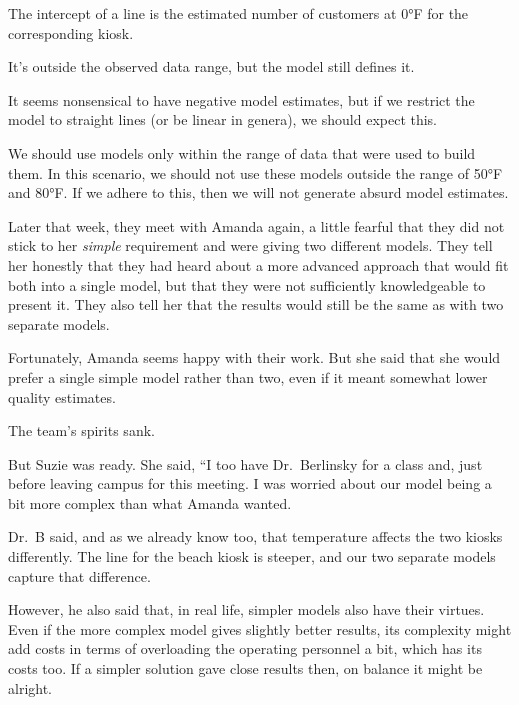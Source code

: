 \documentclass[
  12pt,
  letterpaper,
  DIV=11,
  numbers=noendperiod]{scrreprt}
\begin{document}
\begin{tcolorbox}[enhanced jigsaw, colback=white, leftrule=.75mm, toprule=.15mm, bottomtitle=1mm, breakable, coltitle=black, toptitle=1mm, title=\textcolor{quarto-callout-important-color}{\faExclamation}\hspace{0.5em}{Important}, opacitybacktitle=0.6, colbacktitle=quarto-callout-important-color!10!white, arc=.35mm, left=2mm, colframe=quarto-callout-important-color-frame, titlerule=0mm, rightrule=.15mm, bottomrule=.15mm, opacityback=0]

The intercept of a line is the estimated number of customers at 0°F for
the corresponding kiosk.

It's outside the observed data range, but the model still defines it.

It seems nonsensical to have negative model estimates, but if we
restrict the model to straight lines (or be linear in genera), we should
expect this.

We should use models only within the range of data that were used to
build them. In this scenario, we should not use these models outside the
range of 50°F and 80°F. If we adhere to this, then we will not generate
absurd model estimates.

\end{tcolorbox}

Later that week, they meet with Amanda again, a little fearful that they
did not stick to her \emph{simple} requirement and were giving two
different models. They tell her honestly that they had heard about a
more advanced approach that would fit both into a single model, but that
they were not sufficiently knowledgeable to present it. They also tell
her that the results would still be the same as with two separate
models.

Fortunately, Amanda seems happy with their work. But she said that she
would prefer a single simple model rather than two, even if it meant
somewhat lower quality estimates.

The team's spirits sank.

But Suzie was ready. She said, ``I too have Dr.~Berlinsky for a class
and, just before leaving campus for this meeting. I was worried about
our model being a bit more complex than what Amanda wanted.

Dr.~B said, and as we already know too, that temperature affects the two
kiosks differently. The line for the beach kiosk is steeper, and our two
separate models capture that difference.

However, he also said that, in real life, simpler models also have their
virtues. Even if the more complex model gives slightly better results,
its complexity might add costs in terms of overloading the operating
personnel a bit, which has its costs too. If a simpler solution gave
close results then, on balance it might be alright.
\end{document}
